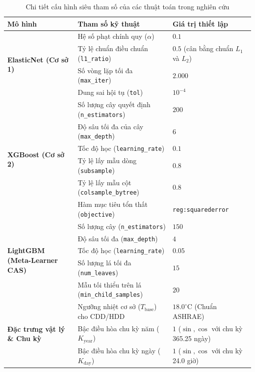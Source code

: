 \begin{table}[H]
\centering
\small
{}
\caption{Chi tiết cấu hình siêu tham số của các thuật toán trong nghiên cứu}
\label{tab:appendix_hyperparameters}
\setlength{\tabcolsep}{6pt}
\renewcommand{\arraystretch}{1.15}
\begin{tabularx}{\linewidth}{@{} l >{\RaggedRight\arraybackslash}X l @{}}
\toprule
\textbf{Mô hình} & \textbf{Tham số kỹ thuật} & \textbf{Giá trị thiết lập} \\
\midrule
\multirow{4}{*}{\textbf{ElasticNet (Cơ sở 1)}} & Hệ số phạt chính quy ($\alpha$) & $0.1$ \\
& Tỷ lệ chuẩn điều chuẩn (\texttt{l1\_ratio}) & $0.5$ (cân bằng chuẩn $L_1$ và $L_2$) \\
& Số vòng lặp tối đa (\texttt{max\_iter}) & $2.000$ \\
& Dung sai hội tụ (\texttt{tol}) & $10^{-4}$ \\
\midrule
\multirow{6}{*}{\textbf{XGBoost (Cơ sở 2)}} & Số lượng cây quyết định (\texttt{n\_estimators}) & $200$ \\
& Độ sâu tối đa của cây (\texttt{max\_depth}) & $6$ \\
& Tốc độ học (\texttt{learning\_rate}) & $0.1$ \\
& Tỷ lệ lấy mẫu dòng (\texttt{subsample}) & $0.8$ \\
& Tỷ lệ lấy mẫu cột (\texttt{colsample\_bytree}) & $0.8$ \\
& Hàm mục tiêu tổn thất (\texttt{objective}) & \texttt{reg:squarederror} \\
\midrule
\multirow{5}{*}{\textbf{LightGBM (Meta-Learner CAS)}} & Số lượng cây (\texttt{n\_estimators}) & $150$ \\
& Độ sâu tối đa (\texttt{max\_depth}) & $4$ \\
& Tốc độ học (\texttt{learning\_rate}) & $0.05$ \\
& Số lượng lá tối đa (\texttt{num\_leaves}) & $15$ \\
& Mẫu tối thiểu trên lá (\texttt{min\_child\_samples}) & $20$ \\
\midrule
\multirow{3}{*}{\textbf{Đặc trưng vật lý \& Chu kỳ}} & Ngưỡng nhiệt cơ sở ($T_{\text{base}}$) cho CDD/HDD & $18.0^\circ\text{C}$ (Chuẩn ASHRAE) \\
& Bậc điều hòa chu kỳ năm ($K_{\text{year}}$) & $1$ ($\sin, \cos$ với chu kỳ 365.25 ngày) \\
& Bậc điều hòa chu kỳ ngày ($K_{\text{day}}$) & $1$ ($\sin, \cos$ với chu kỳ 24.0 giờ) \\
\bottomrule
\end{tabularx}
\end{table}

